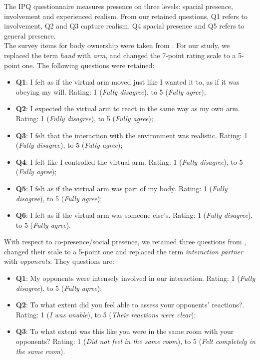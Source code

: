 The IPQ questionnaire measures presence on three levels: spacial presence, involvement and experienced realism. From our retained questions, Q1 refers to involvement, Q2 and Q3 capture realism, Q4 spacial presence and Q5 refers to general presence.
\\
The survey items for body ownership were taken from \cite{argelaguet2016role}. For our study, we replaced the term \textit{hand} with \textit{arm}, and changed the 7-point rating scale to a 5-point one. The following questions were retained:
\begin{itemize}
\label{enum:ownershipQuestions}
\itemsep0em
    \item \textbf{Q1}: I felt as if the virtual arm moved just like I wanted it to, as if it was obeying my will. Rating: 1 (\textit{Fully disagree}), to 5 (\textit{Fully agree});
    \item \textbf{Q2}: I expected the virtual arm to react in the same way as my own arm. Rating: 1 (\textit{Fully disagree}), to 5 (\textit{Fully agree});
    \item \textbf{Q3}: I felt that the interaction with the environment was realistic. Rating: 1 (\textit{Fully disagree}), to 5 (\textit{Fully agree});
    \item \textbf{Q4}: I felt like I controlled the virtual arm. Rating: 1 (\textit{Fully disagree}), to 5 (\textit{Fully agree});
    \item \textbf{Q5}: I felt as if the virtual arm was part of my body. Rating: 1 (\textit{Fully disagree}), to 5 (\textit{Fully agree});
    \item \textbf{Q6}: I felt as if the virtual arm was someone else’s. Rating: 1 (\textit{Fully disagree}), to 5 (\textit{Fully agree}).
\end{itemize}
With respect to co-presence/social presence, we retained three questions from \cite{nowak2003effect}, changed their scale to a 5-point one and replaced the term \textit{interaction partner} with \textit{opponents}. They questions are:
\begin{itemize}
\label{enum:copresenceQuestions}
\itemsep0em
    \item \textbf{Q1}: My opponents were intensely involved in our interaction. Rating: 1 (\textit{Fully disagree}), to 5 (\textit{Fully agree});
    \item \textbf{Q2}: To what extent did you feel able to assess your opponents’ reactions?. Rating: 1 (\textit{I was unable}), to 5 (\textit{Their reactions were clear});
    \item \textbf{Q3}: To what extent was this like you were in the same room with your opponents? Rating: 1 (\textit{Did not feel in the same room}), to 5 (\textit{Felt completely in the same room}).
\end{itemize}
